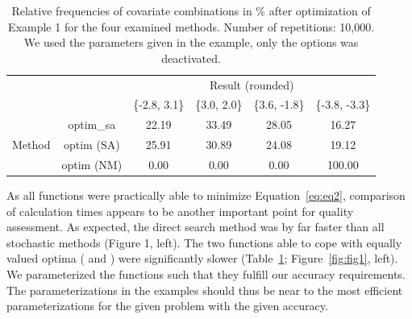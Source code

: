 \begin{table}[]
\centering
\caption{Relative frequencies of covariate combinations in \% after optimization of Example 1 for the four examined methods. Number of repetitions: 10,000. We used the parameters given in the example, only the  options was deactivated.}
\label{tab:tab1}
\begin{tabular}{cccccc} \cline{3-6}
& \multicolumn{1}{c}{} & \multicolumn{4}{c}{Result (rounded)}                    \\ \cline{3-6} 
&                      & \{-2.8, 3.1\} & \{3.0, 2.0\} & \{3.6, -1.8\} & \{-3.8, -3.3\} \\ \cline{2-6} 
\multirow{4}{*}{Method} & optim\_sa          & 22.19     & 33.49    & 28.05     & 16.27      \\
& optim (SA)            & 25.91     & 30.89    & 24.08     & 19.12      \\
& optim (NM)          & 0.00      & 0.00     & 0.00      & 100.00     \\ \cline{2-6} 
\end{tabular}
\end{table}

As all functions were practically able to minimize Equation~\eqref{eq:eq2}, comparison of calculation times appears to be another important point for quality assessment. As expected, the direct search method  was by far faster than all stochastic methods (Figure 1, left). The two functions able to cope with equally valued optima ( and ) were significantly slower (Table~\ref{tab:tab1}; Figure~\ref{fig:fig1}, left). We parameterized the functions such that they fulfill our accuracy requirements. The parameterizations in the examples should thus be near to the most efficient parameterizations for the given problem with the given accuracy.

